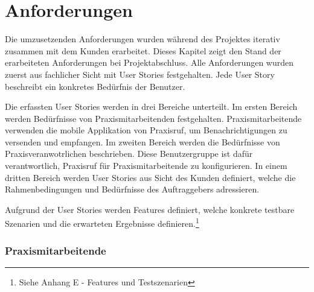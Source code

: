 \section{Anforderungen}\label{sec:anforderungen}

Die umzusetzenden Anforderungen wurden während des Projektes iterativ zusammen mit dem Kunden erarbeitet.
Dieses Kapitel zeigt den Stand der erarbeiteten Anforderungen bei Projektabschluss.
Alle Anforderungen wurden zuerst aus fachlicher Sicht mit User Stories festgehalten.
Jede User Story beschreibt ein konkretes Bedürfnis der Benutzer.


Die erfassten User Stories werden in drei Bereiche unterteilt.
Im ersten Bereich werden Bedürfnisse von Praxismitarbeitenden festgehalten.
Praxismitarbeitende verwenden die mobile Applikation von Praxisruf, um Benachrichtigungen zu versenden und empfangen.
Im zweiten Bereich werden die Bedürfnisse von Praxisveranwotrlichen beschrieben.
Diese Benutzergruppe ist dafür verantwortlich, Praxisruf für Praxismitarbeitende zu konfigurieren.
In einem dritten Bereich werden User Stories aus Sicht des Kunden definiert, welche die Rahmenbedingungen und Bedürfnisse des Auftraggebers adressieren.


Aufgrund der User Stories werden Features definiert, welche konkrete testbare Szenarien und die erwarteten Ergebnisse definieren.\footnote{Siehe Anhang E - Features und Testszenarien}

\subsubsection*{Praxismitarbeitende}

